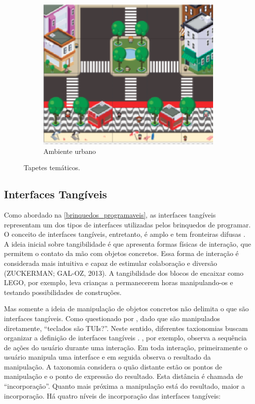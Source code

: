 \begin{figure}[!htbp]
\begin{subfigure}{.33\textwidth}
        \centering
        \includegraphics[width=.9\linewidth,fbox]{figs/tapete_city.png}
        \caption{Ambiente urbano}
        \label{tapete_city}
    \end{subfigure}
    \caption{Tapetes temáticos.}
    \sourceauthor
    \label{rope_mats}
\end{figure}

\subsection{Interfaces Tangíveis}
\label{fundamentacao_sub_interfaces_tangiveis}
Como abordado na \autoref{brinquedos_programaveis}, as interfaces tangíveis representam um dos tipos de interfaces utilizadas pelos brinquedos de programar. O conceito de interfaces tangíveis, entretanto, é amplo e tem fronteiras difusas \cite{falcao_design_2007}. A ideia inicial sobre tangibilidade é que apresenta formas físicas de interação, que permitem o contato da mão com objetos concretos. Essa forma de interação é considerada mais intuitiva e capaz de estimular colaboração e diversão (ZUCKERMAN; GAL-OZ, 2013). A tangibilidade dos blocos de encaixar como LEGO, por exemplo, leva crianças a permanecerem horas manipulando-os e testando possibilidades de construções. 

Mas somente a ideia de manipulação de objetos concretos não delimita o que são interfaces tangíveis. Como questionado por , dado que são manipulados diretamente, “teclados são TUIs?”. Neste sentido, diferentes taxionomias buscam organizar a definição de interfaces tangíveis \cite{fishkin_taxonomy_2004, fincher_tangible_2019}. , por exemplo, observa a sequência de ações do usuário durante uma interação. Em toda interação, primeiramente o usuário manipula uma interface e em seguida observa o resultado da manipulação. A taxonomia considera o quão distante estão os pontos de manipulação e o ponto de expressão do resultado. Esta distância é chamada de “incorporação”. Quanto mais próxima a manipulação está do resultado, maior a incorporação. Há quatro níveis de incorporação das interfaces tangíveis:

